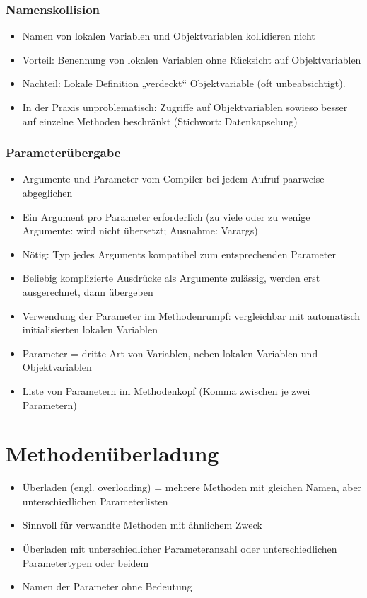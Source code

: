 \subsubsection{Namenskollision}
\begin{itemize}
\item Namen von lokalen Variablen und Objektvariablen kollidieren nicht
\item Vorteil: Benennung von lokalen Variablen ohne Rücksicht auf Objektvariablen
\item Nachteil: Lokale Definition „verdeckt“ Objektvariable (oft unbeabsichtigt).
\item In der Praxis unproblematisch: Zugriffe auf Objektvariablen sowieso besser auf einzelne Methoden beschränkt (Stichwort: Datenkapselung)
\end{itemize}
\subsubsection{Parameterübergabe}
\begin{itemize}
\item Argumente und Parameter vom Compiler bei jedem Aufruf paarweise abgeglichen
\item Ein Argument pro Parameter erforderlich (zu viele oder zu wenige Argumente: wird nicht übersetzt; Ausnahme: Varargs)
\item Nötig: Typ jedes Arguments kompatibel zum entsprechenden Parameter
\item Beliebig komplizierte Ausdrücke als Argumente zulässig, werden erst ausgerechnet, dann übergeben
\item Verwendung der Parameter im Methodenrumpf: vergleichbar mit automatisch initialisierten lokalen Variablen
\item Parameter = dritte Art von Variablen, neben lokalen Variablen und Objektvariablen
\item Liste von Parametern im Methodenkopf (Komma zwischen je zwei Parametern)
\end{itemize}
%
%
%
\section{Methodenüberladung}
\begin{itemize}
\item Überladen (engl. overloading) = mehrere Methoden mit gleichen Namen, aber unterschiedlichen Parameterlisten
\item Sinnvoll für verwandte Methoden mit ähnlichem Zweck
\item Überladen mit unterschiedlicher Parameteranzahl oder unterschiedlichen Parametertypen oder beidem
\item Namen der Parameter ohne Bedeutung
\end{itemize}

